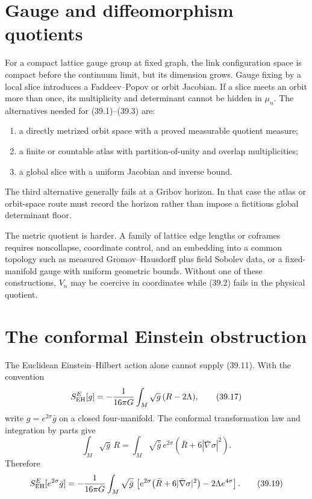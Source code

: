 \documentclass[11pt]{article}
\theoremstyle{remark}
\begin{document}
\section{Gauge and diffeomorphism quotients}

For a compact lattice gauge group at fixed graph, the link
configuration space is compact before the continuum limit, but its
dimension grows.  Gauge fixing by a local slice introduces a
Faddeev--Popov or orbit Jacobian.  If a slice meets an orbit more than
once, its multiplicity and determinant cannot be hidden in
\(\mu_n\).  The alternatives needed for (39.1)--(39.3) are:
\begin{enumerate}
\item a directly metrized orbit space with a proved measurable
      quotient measure;
\item a finite or countable atlas with partition-of-unity and
      overlap multiplicities;
\item a global slice with a uniform Jacobian and inverse bound.
\end{enumerate}
The third alternative generally fails at a Gribov horizon.  In that
case the atlas or orbit-space route must record the horizon rather
than impose a fictitious global determinant floor.

The metric quotient is harder.  A family of lattice edge lengths or
coframes requires noncollapse, coordinate control, and an embedding
into a common topology such as measured Gromov--Hausdorff plus field
Sobolev data, or a fixed-manifold gauge with uniform geometric
bounds.  Without one of these constructions, \(V_n\) may be
coercive in coordinates while (39.2) fails in the physical quotient.

\section{The conformal Einstein obstruction}

The Euclidean Einstein--Hilbert action alone cannot supply
(39.11).  With the convention
\[
 S_{\rm EH}^{E}[g]
 =-\frac1{16\pi G}\int_M\sqrt g\,(R-2\Lambda),           \tag{39.17}
\]
write \(g=e^{2\sigma}\bar g\) on a closed four-manifold.  The
conformal transformation law and integration by parts give
\[
 \int_M\sqrt g\,R
 =
 \int_M\sqrt{\bar g}\,e^{2\sigma}
 \left(\bar R+6|\bar\nabla\sigma|^2\right).              \tag{39.18}
\]
Therefore
\[
 S_{\rm EH}^{E}[e^{2\sigma}\bar g]
 =
 -\frac1{16\pi G}
 \int_M\sqrt{\bar g}\,
 \left[
 e^{2\sigma}\bigl(\bar R+6|\bar\nabla\sigma|^2\bigr)
 -2\Lambda e^{4\sigma}
 \right].                                                \tag{39.19}
\]
\end{document}

